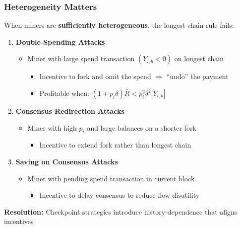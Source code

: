 \documentclass[aspectratio=169, 12pt]{beamer}
\begin{document}
\begin{frame}
\frametitle{Heterogeneity Matters}

When miners are \textbf{sufficiently heterogeneous}, the longest chain rule fails:

\vspace{0.5em}

\begin{enumerate}
    \item \textbf{Double-Spending Attacks}
    \begin{itemize}
        \item Miner with large spend transaction $(Y_{i,b} < 0)$ on longest chain
       \begin{itemize} \item Incentive to fork and omit the spend $\Rightarrow$ ``undo'' the payment
        \item Profitable when: $(1 + p_i \delta)\bar{R} < p_i^2 \delta^2 |Y_{i,b}|$
        \end{itemize}
    \end{itemize}

    \vspace{0.3em}

    \item \textbf{Consensus Redirection Attacks}
    \begin{itemize}
        \item Miner with high $p_i$ and large balances on a shorter fork
        \begin{itemize}
        \item Incentive to extend fork rather than longest chain
        \end{itemize}
    \end{itemize}

    \vspace{0.3em}

    \item \textbf{Saving on Consensus Attacks}
    \begin{itemize}
        \item Miner with pending spend transaction in current block
        \begin{itemize}
        \item Incentive to delay consensus to reduce flow disutility
        \end{itemize}
    \end{itemize}
\end{enumerate}

\vspace{0.5em}

\textbf{Resolution:} Checkpoint strategies introduce history-dependence that aligns incentives

\end{frame}
\end{document}
